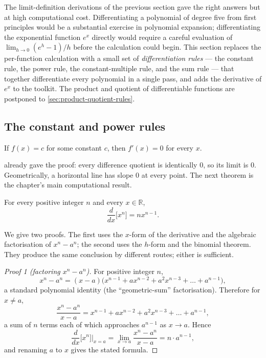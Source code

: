 The limit-definition derivations of the previous section gave the right answers but at high computational cost. Differentiating a polynomial of degree five from first principles would be a substantial exercise in polynomial expansion; differentiating the exponential function \(e^{x}\) directly would require a careful evaluation of \(\lim_{h \to 0} (e^{h} - 1)/h\) before the calculation could begin. This section replaces the per-function calculation with a small set of \emph{differentiation rules} --- the constant rule, the power rule, the constant-multiple rule, and the sum rule --- that together differentiate every polynomial in a single pass, and adds the derivative of \(e^{x}\) to the toolkit. The product and quotient of differentiable functions are postponed to \cref{sec:product-quotient-rules}.

\subsection{The constant and power rules}

\begin{theorem}\label{thm:constant-rule}
If \(f(x) = c\) for some constant \(c\), then \(f'(x) = 0\) for every \(x\).
\end{theorem}

 already gave the proof: every difference quotient is identically \(0\), so its limit is \(0\). Geometrically, a horizontal line has slope \(0\) at every point. The next theorem is the chapter's main computational result.

\begin{theorem}\label{thm:power-rule}
For every positive integer \(n\) and every \(x \in \mathbb{R}\),
\[
\frac{d}{dx}\bigl[x^{n}\bigr] = n x^{n - 1}.
\]
\end{theorem}

We give two proofs. The first uses the \(x\)-form of the derivative and the algebraic factorisation of \(x^{n} - a^{n}\); the second uses the \(h\)-form and the binomial theorem. They produce the same conclusion by different routes; either is sufficient.

\begin{proof}[Proof 1 (factoring \(x^n - a^n\))]
For positive integer \(n\),
\[
x^{n} - a^{n} = (x - a)\bigl(x^{n - 1} + a x^{n - 2} + a^{2} x^{n - 3} + \dots + a^{n - 1}\bigr),
\]
a standard polynomial identity (the ``geometric-sum'' factorisation). Therefore for \(x \neq a\),
\[
\frac{x^{n} - a^{n}}{x - a} = x^{n - 1} + a x^{n - 2} + a^{2} x^{n - 3} + \dots + a^{n - 1},
\]
a sum of \(n\) terms each of which approaches \(a^{n - 1}\) as \(x \to a\). Hence
\[
\frac{d}{dx}\bigl[x^{n}\bigr]\bigg|_{x = a}
= \lim_{x \to a} \frac{x^{n} - a^{n}}{x - a}
= n \cdot a^{n - 1},
\]
and renaming \(a\) to \(x\) gives the stated formula.
\end{proof}

